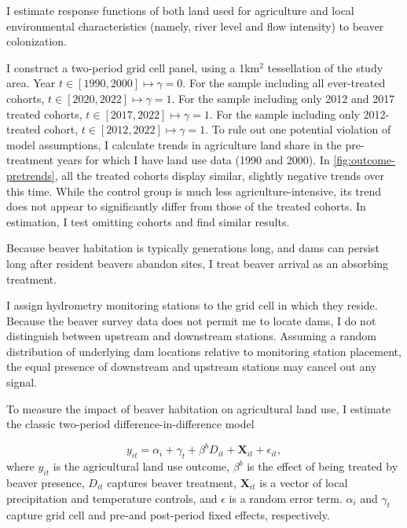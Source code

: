 I estimate response functions of both land used for agriculture and local environmental characteristics (namely, river level and flow intensity) to beaver colonization.

I construct a two-period grid cell panel, using a 1km$^2$ tessellation of the study area. Year $t \in [1990, 2000] \mapsto \gamma = 0$. For the sample including all ever-treated cohorts, $t \in [2020, 2022] \mapsto \gamma = 1$. For the sample including only 2012 and 2017 treated cohorts, $t \in [2017, 2022] \mapsto \gamma = 1$. For the sample including only 2012-treated cohort, $t \in [2012, 2022] \mapsto \gamma = 1$. To rule out one potential violation of model assumptions, I calculate trends in agriculture land share in the pre-treatment years for which I have land use data (1990 and 2000). In \ref{fig:outcome-pretrends}, all the treated cohorts display similar, slightly negative trends over this time. While the control group is much less agriculture-intensive, its trend does not appear to significantly differ from those of the treated cohorts. In estimation, I test omitting cohorts and find similar results.

Because beaver habitation is typically generations long, and dams can persist long after resident beavers abandon sites, I treat beaver arrival as an absorbing treatment.

I assign hydrometry monitoring stations to the grid cell in which they reside. Because the beaver survey data does not permit me to locate dams, I do not distinguish between upstream and downstream stations. Assuming a random distribution of underlying dam locations relative to monitoring station placement, the equal presence of downstream and upstream stations may cancel out any signal.


To measure the impact of beaver habitation on agricultural land use, I estimate the classic two-period difference-in-difference model

\begin{equation} \label{eq:main_beaver_eq}
y_{it} = \alpha_i + \gamma_t + \beta^{b}D_{it} + \mathbf{X}_{it} + \epsilon_{it},
\end{equation}
where $y_{it}$ is the agricultural land use outcome, $\beta^b$ is the effect of being treated by beaver presence, $D_{it}$ captures beaver treatment, $\mathbf{X}_{it}$ is a vector of local precipitation and temperature controls, and $\epsilon$ is a random error term. $\alpha_i$ and $\gamma_t$ capture grid cell and pre-and post-period fixed effects, respectively. 